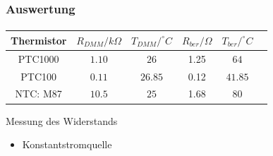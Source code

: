 \begin{frame}
    \frametitle{Auswertung}
    \framesubtitle{}
    \begin{tabular}{c|c|c||c|c|c}
        Thermistor & $R_{DMM}/k\Omega$ & $T_{DMM}/^{\circ}C$ & $R_{ber}/\Omega$
        &$T_{ber}/^{\circ}C$\\
        \hline
        PTC1000 & $1.10$ & $26$ & 1.25 &$64$\\           
        PTC100  & $0.11$ & $26.85$ & 0.12 &$41.85$\\
        NTC: M87& $10.5$ & $25$ & 1.68 &$80$
    \end{tabular}
    \begin{block}{Messung des Widerstands}
         \begin{itemize}
             \item Konstantstromquelle
         \end{itemize}
    \end{block}
\end{frame}
